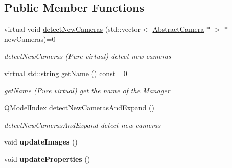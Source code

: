 \subsection*{Public Member Functions}
\begin{DoxyCompactItemize}
\item 
virtual void \hyperlink{class_abstract_camera_manager_a8e215b2531fd8c18551382dc8f571817}{detect\-New\-Cameras} (std\-::vector$<$ \hyperlink{class_abstract_camera}{Abstract\-Camera} $\ast$ $>$ $\ast$new\-Cameras)=0
\begin{DoxyCompactList}\small\item\em detect\-New\-Cameras (Pure virtual) detect new cameras \end{DoxyCompactList}\item 
virtual std\-::string \hyperlink{class_abstract_camera_manager_a6e4b041842471b9ed42ddd5c9ab260d1}{get\-Name} () const =0
\begin{DoxyCompactList}\small\item\em get\-Name (Pure virtual) get the name of the Manager \end{DoxyCompactList}\item 
Q\-Model\-Index \hyperlink{class_abstract_camera_manager_a609f8e3af887c5652ccf9a37d4e133c1}{detect\-New\-Cameras\-And\-Expand} ()
\begin{DoxyCompactList}\small\item\em detect\-New\-Cameras\-And\-Expand detect new cameras \end{DoxyCompactList}\item 
\hypertarget{class_abstract_camera_manager_a336e5cf760314194c1baf1234b87b247}{void {\bfseries update\-Images} ()}\label{class_abstract_camera_manager_a336e5cf760314194c1baf1234b87b247}

\item 
\hypertarget{class_abstract_camera_manager_a518b8dd27c032030ff23930488da0a52}{void {\bfseries update\-Properties} ()}\label{class_abstract_camera_manager_a518b8dd27c032030ff23930488da0a52}


\end{DoxyCompactItemize}
